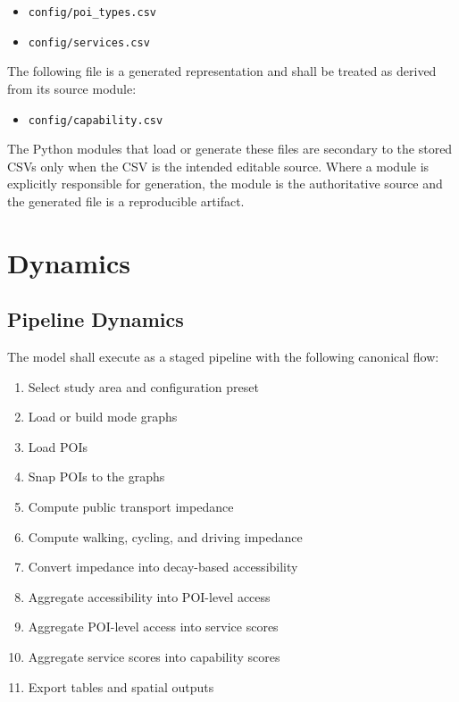 \documentclass[11pt]{article}
\begin{document}
\begin{itemize}
  \item \texttt{config/poi\_types.csv}
  \item \texttt{config/services.csv}
\end{itemize}

The following file is a generated representation and shall be treated as derived from its source module:

\begin{itemize}
  \item \texttt{config/capability.csv}
\end{itemize}

The Python modules that load or generate these files are secondary to the stored CSVs only when the CSV is the intended editable source. Where a module is explicitly responsible for generation, the module is the authoritative source and the generated file is a reproducible artifact.

\section{Dynamics}

\subsection*{Pipeline Dynamics}

The model shall execute as a staged pipeline with the following canonical flow:

\begin{enumerate}
  \item Select study area and configuration preset
  \item Load or build mode graphs
  \item Load POIs
  \item Snap POIs to the graphs
  \item Compute public transport impedance
  \item Compute walking, cycling, and driving impedance
  \item Convert impedance into decay-based accessibility
  \item Aggregate accessibility into POI-level access
  \item Aggregate POI-level access into service scores
  \item Aggregate service scores into capability scores
  \item Export tables and spatial outputs
\end{enumerate}
\end{document}

